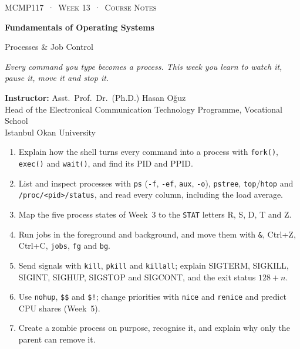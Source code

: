 \documentclass[11pt,a4paper]{article}
\newcommand{\cmd}[1]{\texttt{#1}}
\begin{document}
\lstset{tabsize=8}
\thispagestyle{empty}
\begin{tcolorbox}[enhanced,colback=dark,colframe=dark,arc=0pt,boxrule=0pt,
  left=18pt,right=18pt,top=20pt,bottom=20pt,coltext=white]
{\small\color{mint}\textsc{MCMP117 \,·\, Week 13 \,·\, Course Notes}}\par\medskip
{\headfont\fontsize{26}{30}\selectfont\bfseries Fundamentals of Operating Systems}\par\medskip
{\large Processes \& Job Control}\par\smallskip
{\small\itshape\color{white!70} Every command you type becomes a process. This week you learn to watch it, pause it, move it and stop it.}
\end{tcolorbox}

\vspace{0.4em}
{\small
\textbf{Instructor:} Asst.\ Prof.\ Dr.\ (Ph.D.) Hasan Oğuz\\
Head of the Electronical Communication Technology Programme, Vocational School\\
Istanbul Okan University\par}

\vspace{0.8em}
\begin{keyidea}
\begin{enumerate}[leftmargin=1.4em]
  \item Explain how the shell turns every command into a process with \cmd{fork()}, \cmd{exec()} and \cmd{wait()}, and find its PID and PPID.
  \item List and inspect processes with \cmd{ps} (\cmd{-f}, \cmd{-ef}, \cmd{aux}, \cmd{-o}), \cmd{pstree}, \cmd{top}/\cmd{htop} and \texttt{/proc/<pid>/status}, and read every column, including the load average.
  \item Map the five process states of Week~3 to the \texttt{STAT} letters R, S, D, T and Z.
  \item Run jobs in the foreground and background, and move them with \texttt{\&}, Ctrl+Z, Ctrl+C, \cmd{jobs}, \cmd{fg} and \cmd{bg}.
  \item Send signals with \cmd{kill}, \cmd{pkill} and \cmd{killall}; explain SIGTERM, SIGKILL, SIGINT, SIGHUP, SIGSTOP and SIGCONT, and the exit status $128 + n$.
  \item Use \cmd{nohup}, \verb|$$| and \verb|$!|; change priorities with \cmd{nice} and \cmd{renice} and predict CPU shares (Week~5).
  \item Create a zombie process on purpose, recognise it, and explain why only the parent can remove it.
\end{enumerate}
\end{keyidea}
\end{document}
